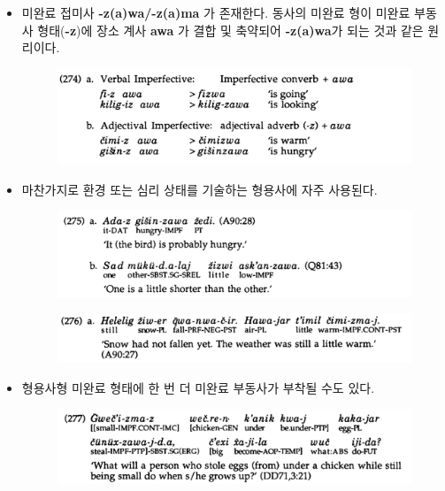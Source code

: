 \begin{itemize}
\item 미완료 접미사 \textbf{-z(a)wa/-z(a)ma} 가 존재한다. 동사의 미완료 형이 미완료 부동사 형태(\textbf{-z})에 장소 계사 \textbf{awa} 가 결합 및 축약되어 \textbf{-z(a)wa}가 되는 것과 같은 원리이다.
\begin{figure}[H]
\centerline{\includegraphics[width=.8\linewidth]{Lezgian/src/ex274.png}}
\end{figure}
\item 마찬가지로 환경 또는 심리 상태를 기술하는 형용사에 자주 사용된다.
\begin{figure}[H]
\centerline{\includegraphics[width=.8\linewidth]{Lezgian/src/ex275.png}}
\end{figure}
\begin{figure}[H]
\centerline{\includegraphics[width=.8\linewidth]{Lezgian/src/ex276a.png}}
\end{figure}
\item 형용사형 미완료 형태에 한 번 더 미완료 부동사가 부착될 수도 있다.
\begin{figure}[H]
\centerline{\includegraphics[width=.8\linewidth]{Lezgian/src/ex277.png}}
\end{figure}
\end{itemize}


